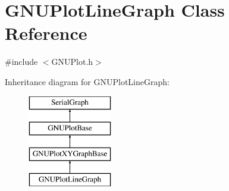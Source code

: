\hypertarget{class_g_n_u_plot_line_graph}{}\section{G\+N\+U\+Plot\+Line\+Graph Class Reference}
\label{class_g_n_u_plot_line_graph}


{\ttfamily \#include $<$G\+N\+U\+Plot.\+h$>$}

Inheritance diagram for G\+N\+U\+Plot\+Line\+Graph\+:\begin{figure}[H]
\begin{center}
\leavevmode
\includegraphics[height=4.000000cm]{class_g_n_u_plot_line_graph}
\end{center}
\end{figure}
